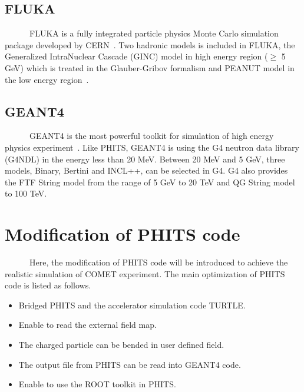   \subsection{FLUKA}
~~~~~~FLUKA is a fully integrated particle physics Monte Carlo simulation package developed by CERN~\cite{fluka}.
Two hadronic models is included in FLUKA, the Generalized IntraNuclear Cascade (GINC) model in high energy region ($\ge$ 5 GeV) which is treated in the Glauber-Gribov formalism and PEANUT model in the low energy region~\cite{fluka2}.

  \subsection{GEANT4}
~~~~~~GEANT4 is the most powerful toolkit for simulation of high energy physics experiment~\cite{geant4}.
Like PHITS, GEANT4 is using the G4 neutron data library (G4NDL) in the energy less than 20 MeV.
Between 20 MeV and 5 GeV, three models, Binary, Bertini and INCL++, can be selected in G4.
G4 also provides the FTF String model from the range of 5 GeV to 20 TeV and QG String model to 100 TeV.

 \section{Modification of PHITS code}
~~~~~~Here, the modification of PHITS code will be introduced to achieve the realistic simulation of COMET experiment.
The main optimization of PHITS code is listed as follows.
\begin{itemize}
 \setlength{\itemsep}{-5pt}
 \item Bridged PHITS and the accelerator simulation code TURTLE.
 \item Enable to read the external field map.
 \item The charged particle can be bended in user defined field.
 \item The output file from PHITS can be read into GEANT4 code.
 \item Enable to use the ROOT toolkit in PHITS.
\end{itemize}


